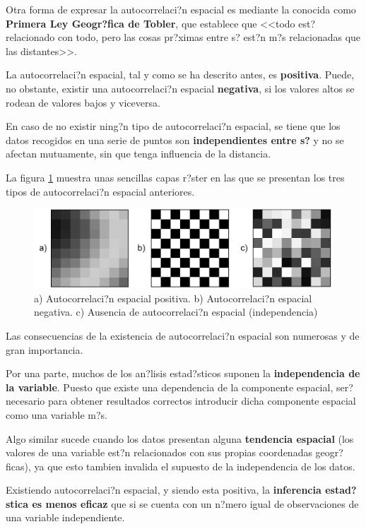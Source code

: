 Otra forma de expresar la autocorrelaci?n espacial es mediante la conocida como \textbf{Primera Ley Geogr?fica de Tobler}, que establece que <<todo est? relacionado con todo, pero las cosas pr?ximas entre s? est?n m?s relacionadas que las distantes>>.

La autocorrelaci?n espacial, tal y como se ha descrito antes, es \textbf{positiva}. Puede, no obstante, existir una autocorrelaci?n espacial \textbf{negativa}, si los valores altos se rodean de valores bajos y viceversa.

En caso de no existir ning?n tipo de autocorrelaci?n espacial, se tiene que los datos recogidos en una serie de puntos son \textbf{independientes entre s?} y no se afectan mutuamente, sin que tenga influencia de la distancia.

La figura \ref{Fig:Autocorrelacion_espacial} muestra unas sencillas capas r?ster en las que se presentan los tres tipos de autocorrelaci?n espacial anteriores.

\begin{figure}[!hbt]   
\centering
\includegraphics[width=\textwidth]{../es/Analisis/Autocorrelacion_espacial.png}
\caption{\small a) Autocorrelaci?n espacial positiva. b) Autocorrelaci?n espacial negativa. c) Ausencia de autocorrelaci?n espacial (independencia)}
\label{Fig:Autocorrelacion_espacial} 
\end{figure}

Las consecuencias de la existencia de autocorrelaci?n espacial son numerosas y de gran importancia.

Por una parte, muchos de los an?lisis estad?sticos suponen la \textbf{independencia de la variable}. Puesto que existe una dependencia de la componente espacial, ser? necesario para obtener resultados correctos introducir dicha componente espacial como una variable m?s. 

Algo similar sucede cuando los datos presentan alguna \textbf{tendencia espacial} (los valores de una variable est?n relacionados con sus propias coordenadas geogr?ficas), ya que esto tambien invalida el supuesto de la independencia de los datos.

Existiendo autocorrelaci?n espacial, y siendo esta positiva, la \textbf{inferencia estad?stica es menos eficaz} que si se cuenta con un n?mero igual de observaciones de una variable independiente. 

